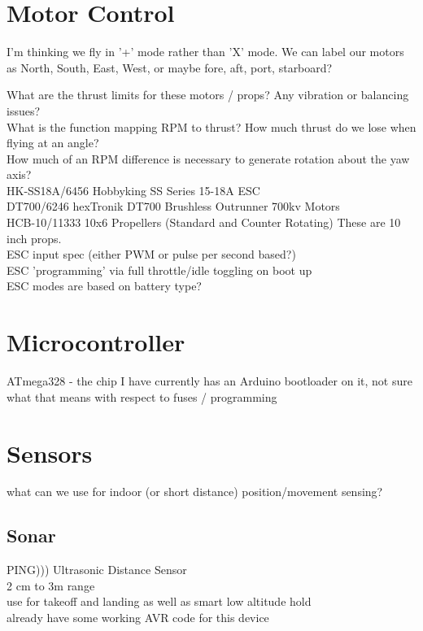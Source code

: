 \documentclass{article}
\begin{document}
\section{Motor Control}
I'm thinking we fly in '+' mode rather than 'X' mode.  We can label our motors as North, South, East, West, or maybe fore, aft, port, starboard?

What are the thrust limits for these motors / props? Any vibration or balancing issues?\\
What is the function mapping RPM to thrust?  How much thrust do we lose when flying at an angle?\\
How much of an RPM difference is necessary to generate rotation about the yaw axis?\\

HK-SS18A/6456 Hobbyking SS Series 15-18A ESC\\
DT700/6246 hexTronik DT700 Brushless Outrunner 700kv Motors\\
HCB-10/11333 10x6 Propellers (Standard and Counter Rotating) These are 10 inch props.\\

ESC input spec (either PWM or pulse per second based?)\\
ESC 'programming' via full throttle/idle toggling on boot up\\
ESC modes are based on battery type?\\

\section{Microcontroller}
ATmega328 - the chip I have currently has an Arduino bootloader on it, not sure what that means with respect to fuses / programming

\section{Sensors}
what can we use for indoor (or short distance) position/movement sensing?

\subsection{Sonar}
PING))) Ultrasonic Distance Sensor\\
2 cm to 3m range\\
use for takeoff and landing as well as smart low altitude hold\\
already have some working AVR code for this device
\end{document}
